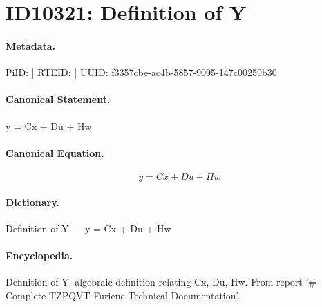 \section*{ID10321: Definition of Y}
\paragraph{Metadata.}
PiID:  | RTEID:  | UUID: f3357cbe-ac4b-5857-9095-147c00259b30

\paragraph{Canonical Statement.}
y = Cx + Du + Hw

\paragraph{Canonical Equation.}
\[
y = Cx + Du + Hw
\]

\paragraph{Dictionary.}
Definition of Y — y = Cx + Du + Hw

\paragraph{Encyclopedia.}
Definition of Y: algebraic definition relating Cx, Du, Hw. From report '\# Complete TZPQVT-Furiene Technical Documentation'.
